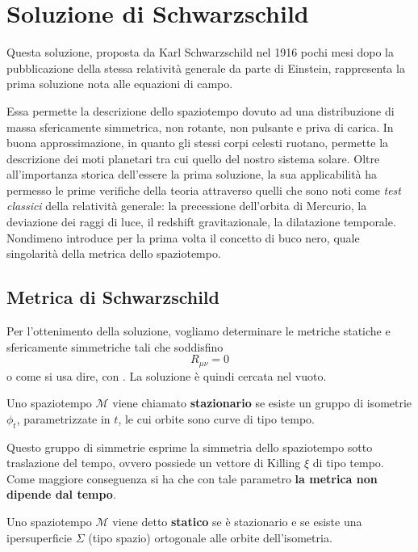 \chapter{Soluzione di Schwarzschild}\label{para.schwarz}
Questa soluzione, proposta da Karl Schwarzschild nel 1916 pochi mesi dopo la pubblicazione della stessa relatività generale da parte di Einstein, rappresenta la prima soluzione nota alle equazioni di campo.

Essa permette la descrizione dello spaziotempo dovuto ad una distribuzione di massa sfericamente simmetrica, non rotante, non pulsante e priva di carica. In buona approssimazione, in quanto gli stessi corpi celesti ruotano, permette la descrizione dei moti planetari tra cui quello del nostro sistema solare. Oltre all'importanza storica dell'essere la prima soluzione, la sua applicabilità ha permesso le prime verifiche della teoria attraverso quelli che sono noti come \emph{test classici} della relatività generale: la precessione dell'orbita di Mercurio, la deviazione dei raggi di luce, il redshift gravitazionale, la dilatazione temporale.
Nondimeno introduce per la prima volta il concetto di buco nero, quale singolarità della metrica dello spaziotempo.

\section{Metrica di Schwarzschild}
Per l'ottenimento della soluzione, vogliamo determinare le metriche statiche e sfericamente simmetriche tali che soddisfino
\begin{equation*}
    R_{\mu\nu}=0
\end{equation*}
o come si usa dire, con . La soluzione è quindi cercata nel vuoto.
\begin{definizione}
Uno spaziotempo $\mathcal{M}$ viene chiamato \textbf{stazionario} se esiste un gruppo di isometrie $\phi_t$, parametrizzate in $t$, le cui orbite sono curve di tipo tempo. 
\end{definizione}
Questo gruppo di simmetrie esprime la simmetria dello spaziotempo sotto traslazione del tempo, ovvero possiede un vettore di Killing $\xi$ di tipo tempo.
Come maggiore conseguenza si ha che con tale parametro \textbf{la metrica non dipende dal tempo}.
\begin{definizione}
Uno spaziotempo $\mathcal{M}$ viene detto \textbf{statico} se è stazionario e se esiste una ipersuperficie $\Sigma$ (tipo spazio) ortogonale alle orbite dell'isometria.
\end{definizione}

